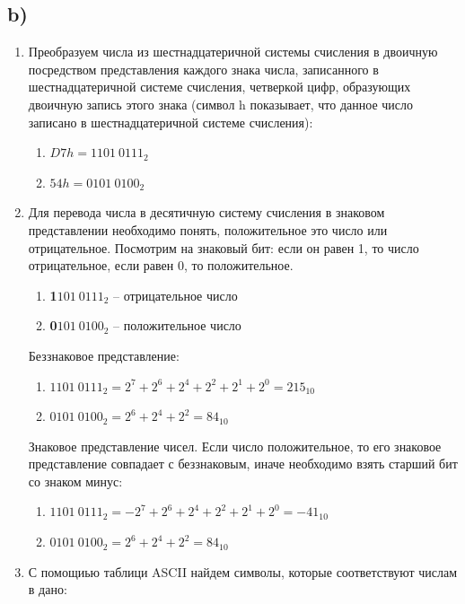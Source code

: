 \documentclass[12pt]{article}
\begin{document}
	\subsection*{b)}
	\begin{enumerate}
		\item Преобразуем числа из шестнадцатеричной системы счисления в двоичную посредством представления каждого знака числа, записанного в шестнадцатеричной системе счисления, четверкой цифр, образующих двоичную запись этого знака (символ h показывает, что данное число записано в шестнадцатеричной системе счисления):
		
		\begin{enumerate}
			\item $D7h = 1101\:0111_2$ 
			\item $54h = 0101\:0100_2$
		\end{enumerate}
		
		\item Для перевода числа в десятичную систему счисления в знаковом представлении необходимо понять, положительное это число или отрицательное. Посмотрим на знаковый бит: если он равен 1, то число отрицательное, если равен 0, то положительное.
		
		\begin{enumerate}
			\item \textbf{1}$101\:0111_2$ -- отрицательное число
			\item \textbf{0}$101\:0100_2$ -- положительное число
		\end{enumerate}
		
		Беззнаковое представление:
		
		\begin{enumerate}
			\item $1101\:0111_2 = 2^7 + 2^6 + 2^4 + 2^2 + 2^1 + 2^0 = 215_{10}$ 
			\item $0101\:0100_2 = 2^6 + 2^4 + 2^2 = 84_{10}$ 
		\end{enumerate}
		
		Знаковое представление чисел. Если число положительное, то его знаковое представление совпадает с беззнаковым, иначе необходимо взять старший бит со знаком минус:
		
		\begin{enumerate}
			\item $1101\:0111_2 = -2^7 + 2^6 + 2^4 + 2^2 + 2^1 + 2^0 = -41_{10}$ 
			\item $0101\:0100_2 = 2^6 + 2^4 + 2^2 = 84_{10}$ 
		\end{enumerate}
		
		\item С помощиью таблици ASCII найдем символы, которые соответствуют числам в дано:
	\end{enumerate} 
	
\end{document}
